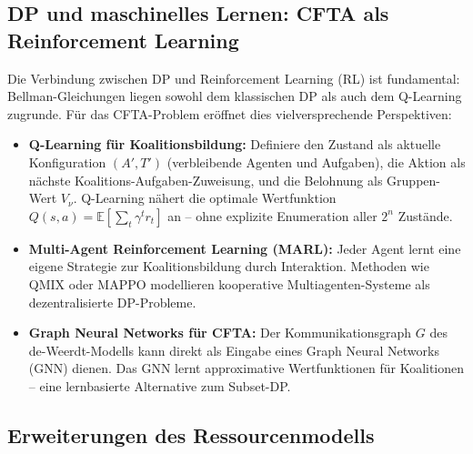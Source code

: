 \documentclass[a4paper,12pt]{article}
\theoremstyle{definition}
\begin{document}
\subsection{DP und maschinelles Lernen: CFTA als Reinforcement Learning}

Die Verbindung zwischen DP und Reinforcement Learning (RL) \cite{sutton2018} ist
fundamental: Bellman-Gleichungen liegen sowohl dem klassischen DP als auch dem
Q-Learning zugrunde. F\"{u}r das CFTA-Problem er\"{o}ffnet dies vielversprechende
Perspektiven:

\begin{itemize}
    \item \textbf{Q-Learning f\"{u}r Koalitionsbildung:} Definiere den Zustand als
          aktuelle Konfiguration $(A', T')$ (verbleibende Agenten und Aufgaben),
          die Aktion als n\"{a}chste Koalitions-Aufgaben-Zuweisung, und die Belohnung
          als Gruppen-Wert $V_\nu$. Q-Learning n\"{a}hert die optimale
          Wertfunktion $Q(s, a) = \mathbb{E}[\sum_{t} \gamma^t r_t]$ an
          -- ohne explizite Enumeration aller $2^n$ Zust\"{a}nde.
    \item \textbf{Multi-Agent Reinforcement Learning (MARL):} Jeder Agent
          lernt eine eigene Strategie zur Koalitionsbildung durch Interaktion.
          Methoden wie QMIX \cite{rashid2018} oder MAPPO modellieren kooperative
          Multiagenten-Systeme als dezentralisierte DP-Probleme.
    \item \textbf{Graph Neural Networks f\"{u}r CFTA:} Der Kommunikationsgraph $G$
          des de-Weerdt-Modells kann direkt als Eingabe eines Graph Neural
          Networks (GNN) dienen. Das GNN lernt approximative Wertfunktionen
          f\"{u}r Koalitionen -- eine lernbasierte Alternative zum Subset-DP.
\end{itemize}

\subsection{Erweiterungen des Ressourcenmodells}
\end{document}
